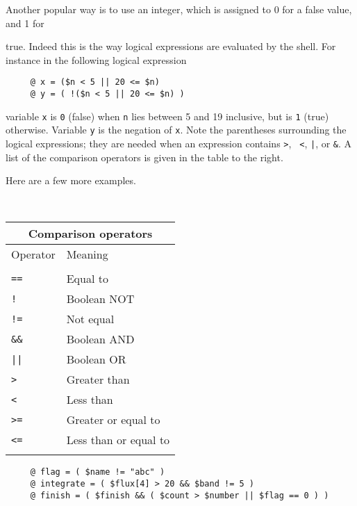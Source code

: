 \documentclass[twoside,11pt]{article}
\newcommand{\latexelsehtml}[2]{#1}
\newcommand{\latexelsehtml}[2]{#2}
\begin{document}
Another popular way is to use an integer, which is assigned to 0 for
a false value, and 1 for 
\begin{minipage}{80mm}
\smallskip
true.  Indeed this is the way logical expressions are evaluated by the
shell.  For instance in the following logical expression

\small
\begin{verbatim}
     @ x = ($n < 5 || 20 <= $n)
     @ y = ( !($n < 5 || 20 <= $n) )
\end{verbatim}
\normalsize
\normalsize
variable {\tt x} is {\tt 0} (false) when {\tt n} lies between 5 and 19
inclusive, but is {\tt 1} (true) otherwise.  Variable {\tt y} is the
negation of {\tt x}.  Note the parentheses surrounding the logical
expressions; they are needed when an expression contains {\tt >}, {\tt
<}, {\tt |}, or {\tt \&}.  A list of the comparison operators is given
in the table \latexelsehtml{to the right}{below}.
\smallskip

Here are a few more examples.
\end{minipage}
\ \hfill \
\begin{minipage}{64mm}
\vspace*{3mm}
\label{sc4_tab_comp_oper}
\begin{tabular}{ll}
\hline
\multicolumn{2}{c}{Comparison operators} \\ \hline
Operator & Meaning \\ \hline
\vspace*{-\medskipamount} \\
{\tt ==} & Equal to \\
{\tt !}  & Boolean NOT \\
{\tt !=} & Not equal \\
{\tt \&\&} & Boolean AND \\
{\tt ||} & Boolean OR \\
{\tt >} & Greater than \\
{\tt <} & Less than \\
{\tt >=} & Greater or equal to \\
{\tt <=} & Less than or equal to \\ 
\vspace*{-\medskipamount} \\ \hline
\end{tabular}
\end{minipage}
\vspace*{1mm}

\small
\begin{verbatim}
     @ flag = ( $name != "abc" )
     @ integrate = ( $flux[4] > 20 && $band != 5 )
     @ finish = ( $finish && ( $count > $number || $flag == 0 ) )
\end{verbatim}
\normalsize
\end{document}
